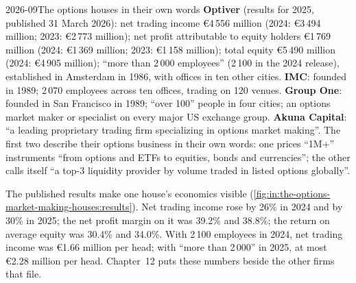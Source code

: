 \begin{dated}{2026-09}{The options houses in their own words}\label{dat:in:the-options-market-making-houses:houses}
\textbf{Optiver} (results for 2025, published 31 March 2026): net trading income \euro4\,556 million (2024: \euro3\,494
million; 2023: \euro2\,773 million); net profit attributable to equity holders \euro1\,769 million (2024: \euro1\,369
million; 2023: \euro1\,158 million); total equity \euro5\,490 million (2024: \euro4\,905 million); ``more than 2\,000
employees'' (2\,100 in the 2024 release), established in Amsterdam in 1986, with offices in ten other cities.
\textbf{IMC}: founded in 1989; 2\,070 employees across ten offices, trading on 120 venues.
\textbf{Group One}: founded in San Francisco in 1989; ``over 100'' people in four cities; an options market maker or
specialist on every major US exchange group. \textbf{Akuna Capital}: ``a leading proprietary trading firm specializing
in options market making''. The first two describe their options business in their own words: one prices ``1M+''
instruments ``from options and ETFs to equities, bonds and currencies''; the other calls itself ``a top-3 liquidity
provider by volume traded in listed options globally''.
\end{dated}

The published results make one house's economics visible (\cref{fig:in:the-options-market-making-houses:results}).
Net trading income rose by 26\% in 2024 and by 30\% in 2025; the net profit margin on it was 39.2\% and 38.8\%; the
return on average equity was 30.4\% and 34.0\%. With 2\,100 employees in 2024, net trading income was \euro1.66 million
per head; with ``more than 2\,000'' in 2025, at most \euro2.28 million per head. Chapter~12 puts these numbers beside
the other firms that file.

